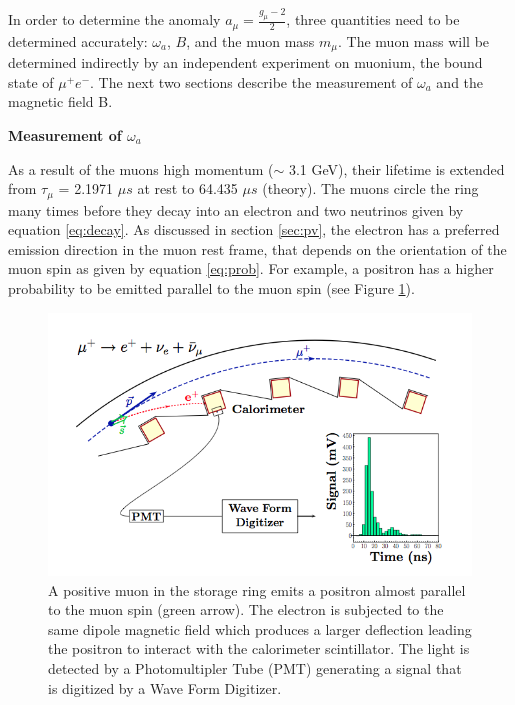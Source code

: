 \documentclass{outhesis}
\begin{document}
In order to determine the anomaly $a_{\mu} = \frac{g_{\mu}-2}{2}$, three quantities need to be determined accurately: $\omega_a$, $B$, and the muon mass $m_{\mu}$. The muon mass will be determined indirectly by an independent experiment on muonium, the bound state of $\mu^+e^-$. The next two sections describe the measurement of $\omega_a$ and the magnetic field B.

\textbf{Measurement of $\omega_a$}

As a result of the muons high momentum ($\sim$ 3.1 GeV), their lifetime is extended from $\tau_{\mu}$ = 2.1971 $\mu s$ at rest to 64.435 $\mu s$ (theory). The muons circle the ring many times before they decay into an electron and two neutrinos given by equation \ref{eq:decay}. As discussed in section \ref{sec:pv}, the electron has a preferred emission direction in the muon rest frame, that depends on the orientation of the muon spin as given by equation \ref{eq:prob}. For example, a positron has a higher probability to be emitted parallel to the muon spin (see Figure \ref{fig:det}). 
\begin{figure}
  \centering
  \includegraphics[scale=0.5]{figures/detection}
  \caption{A positive muon in the storage ring emits a positron almost parallel to the muon spin (green arrow). The electron is subjected to the same dipole magnetic field which produces a larger deflection leading the positron to interact with the calorimeter scintillator. The light is detected by a Photomultipler Tube (PMT) generating a signal that is digitized by a Wave Form Digitizer. \cite{phen}}
  \label{fig:det}
\end{figure}
\end{document}
